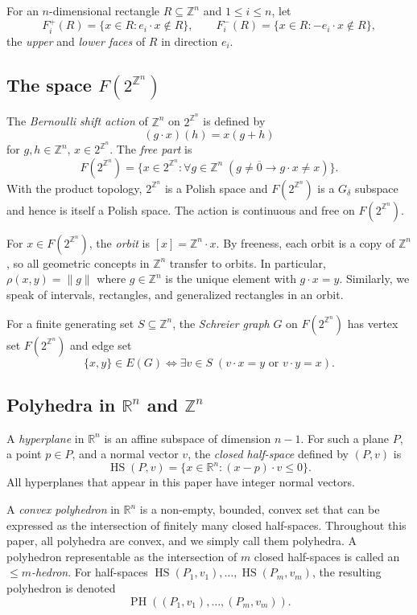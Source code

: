 \documentclass{amsart}
\theoremstyle{definition}
\begin{document}
For an $n$-dimensional rectangle $R\subseteq\mathbb{Z}^n$ and
$1\leq i\leq n$, let
\[
F_i^+(R)=\{x\in R\colon e_i\cdot x\notin R\},\qquad
F_i^-(R)=\{x\in R\colon -e_i\cdot x\notin R\},
\]
the {\em upper} and {\em lower faces} of $R$ in direction $e_i$.

\subsection{The space $F(2^{\mathbb{Z}^n})$}

The {\em Bernoulli shift action} of $\mathbb{Z}^n$ on $2^{\mathbb{Z}^n}$ is defined by 
$$(g\cdot x)(h)=x(g+h)$$ for $g,h\in\mathbb{Z}^n$, $x\in 2^{\mathbb{Z}^n}$.
The {\em free part} is
\[
F(2^{\mathbb{Z}^n})=\{x\in 2^{\mathbb{Z}^n}\colon
\forall g\in\mathbb{Z}^n\;(g\neq \overline{0}\rightarrow g\cdot x\neq x)\}.
\]
With the product topology, $2^{\mathbb{Z}^n}$ is a Polish space and
$F(2^{\mathbb{Z}^n})$ is a $G_\delta$ subspace and hence is itself a Polish space. The action is continuous
and free on $F(2^{\mathbb{Z}^n})$.

For $x\in F(2^{\mathbb{Z}^n})$, the {\em orbit} is $[x]=\mathbb{Z}^n\cdot x$.
By freeness, each orbit is a copy of $\mathbb{Z}^n$, so all geometric
concepts in $\mathbb{Z}^n$ transfer to orbits. In particular,
$\rho(x,y)=\|g\|$ where $g\in\mathbb{Z}^n$ is the unique element with
$g\cdot x=y$. Similarly, we speak of intervals, rectangles, and generalized
rectangles in an orbit.

For a finite generating set $S\subseteq \mathbb{Z}^n$, the {\em Schreier
graph} $G$ on $F(2^{\mathbb{Z}^n})$ has vertex set $F(2^{\mathbb{Z}^n})$
and edge set
\[
\{x,y\}\in E(G)\iff \exists v\in S\;(v\cdot x=y\text{ or }v\cdot y=x).
\]

\subsection{Polyhedra in $\mathbb{R}^n$ and $\mathbb{Z}^n$}\label{sec:polyhedra}

A {\em hyperplane} in $\mathbb{R}^n$ is an affine subspace
of dimension $n-1$. For such a plane $P$, a point $p\in P$, and a normal
vector $v$, the {\em closed half-space} defined by $(P,v)$ is
\[
\operatorname{HS}(P,v)=\{x\in\mathbb{R}^n\colon (x-p)\cdot v\leq 0\}.
\]
All hyperplanes that appear in this paper have integer normal vectors.

A {\em convex polyhedron} in $\mathbb{R}^n$ is a non-empty, bounded, convex
set that can be expressed as the intersection of finitely many closed
half-spaces. Throughout this paper, all polyhedra are convex, and we simply
call them polyhedra. A polyhedron representable as the intersection of $m$
closed half-spaces is called an {\em $\leq\!\! m$-hedron}. For half-spaces
$\operatorname{HS}(P_1,v_1),\dots,\operatorname{HS}(P_m,v_m)$, the resulting
polyhedron is denoted $$\operatorname{PH}((P_1,v_1),\dots,(P_m,v_m)).$$
\end{document}
